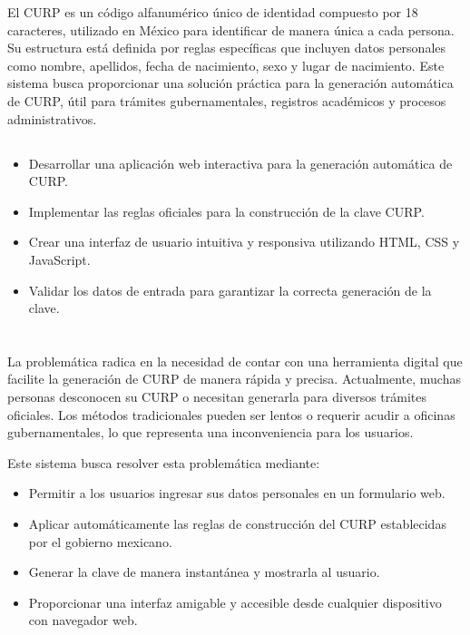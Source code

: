 \documentclass[10pt,a4paper]{article}
\begin{document}
El CURP es un código alfanumérico único de identidad compuesto por 18 caracteres, utilizado en México para identificar de manera única a cada persona. Su estructura está definida por reglas específicas que incluyen datos personales como nombre, apellidos, fecha de nacimiento, sexo y lugar de nacimiento. Este sistema busca proporcionar una solución práctica para la generación automática de CURP, útil para trámites gubernamentales, registros académicos y procesos administrativos.

\subsection{\color{colorESCOM}{Objetivos}}
\begin{itemize}
	\item Desarrollar una aplicación web interactiva para la generación automática de CURP.
	\item Implementar las reglas oficiales para la construcción de la clave CURP.
	\item Crear una interfaz de usuario intuitiva y responsiva utilizando HTML, CSS y JavaScript.
	\item Validar los datos de entrada para garantizar la correcta generación de la clave.
\end{itemize}

\pagebreak

\section{\color{colorIPN}{Problemática}}
La problemática radica en la necesidad de contar con una herramienta digital que facilite la generación de CURP de manera rápida y precisa. Actualmente, muchas personas desconocen su CURP o necesitan generarla para diversos trámites oficiales. Los métodos tradicionales pueden ser lentos o requerir acudir a oficinas gubernamentales, lo que representa una inconveniencia para los usuarios.

Este sistema busca resolver esta problemática mediante:

\begin{itemize}
	\item Permitir a los usuarios ingresar sus datos personales en un formulario web.
	\item Aplicar automáticamente las reglas de construcción del CURP establecidas por el gobierno mexicano.
	\item Generar la clave de manera instantánea y mostrarla al usuario.
	\item Proporcionar una interfaz amigable y accesible desde cualquier dispositivo con navegador web.
\end{itemize}
\end{document}
